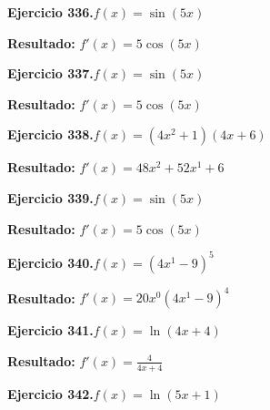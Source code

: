 \documentclass[10pt,a4paper]{article}
\begin{document}
\begin{ejbox}
\textbf{Ejercicio 336.}\quad $f(x) = \sin(5x)$
\end{ejbox}

\begin{solbox}
\textbf{Resultado:} \(\displaystyle f'(x) = 5\cos(5x)\)
\end{solbox}

\newpage
\begin{ejbox}
\textbf{Ejercicio 337.}\quad $f(x) = \sin(5x)$
\end{ejbox}

\begin{solbox}
\textbf{Resultado:} \(\displaystyle f'(x) = 5\cos(5x)\)
\end{solbox}

\begin{ejbox}
\textbf{Ejercicio 338.}\quad $f(x) = (4x^{2} +1)(4x +6)$
\end{ejbox}

\begin{solbox}
\textbf{Resultado:} \(\displaystyle f'(x) = 48x^{2} +52x^{1} +6\)
\end{solbox}

\begin{ejbox}
\textbf{Ejercicio 339.}\quad $f(x) = \sin(5x)$
\end{ejbox}

\begin{solbox}
\textbf{Resultado:} \(\displaystyle f'(x) = 5\cos(5x)\)
\end{solbox}

\newpage
\begin{ejbox}
\textbf{Ejercicio 340.}\quad $f(x) = (4x^{1} -9)^{5}$
\end{ejbox}

\begin{solbox}
\textbf{Resultado:} \(\displaystyle f'(x) = 20x^{0}(4x^{1} -9)^{4}\)
\end{solbox}

\begin{ejbox}
\textbf{Ejercicio 341.}\quad $f(x) = \ln(4x + 4)$
\end{ejbox}

\begin{solbox}
\textbf{Resultado:} \(\displaystyle f'(x) = \frac{4}{4x + 4}\)
\end{solbox}

\begin{ejbox}
\textbf{Ejercicio 342.}\quad $f(x) = \ln(5x + 1)$
\end{ejbox}
\end{document}
